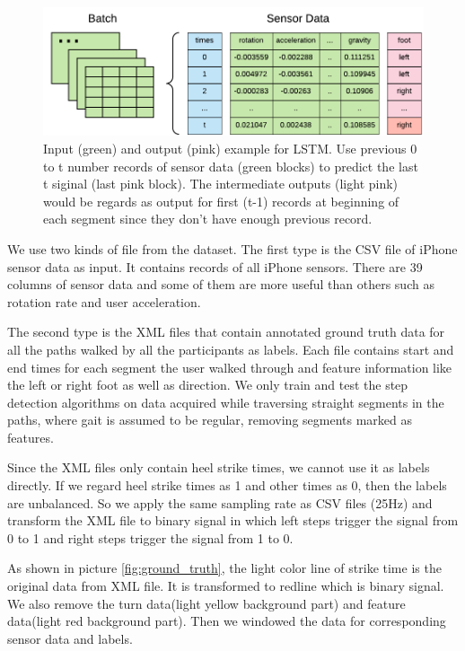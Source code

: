 \documentclass[11pt]{article}
\begin{document}
{\begin{figure}[ht]
\centering
\includegraphics[scale=1]{input2}
\caption{Input (green) and output (pink) example for LSTM. Use previous 0 to t number records of sensor data (green blocks) to predict the last t siginal (last pink block). The intermediate outputs (light pink) would be regards as output for first (t-1) records at beginning of each segment since they don't have enough previous record. }
\label{fig:batch_sensor_data}
\end{figure}

We use two kinds of file from the dataset. The first type is the CSV file of iPhone sensor data as input. It contains records of all iPhone sensors. There are 39 columns of sensor data and some of them are more useful than others such as rotation rate and user acceleration.

The second type is the XML files that contain annotated ground truth data for all the paths walked by all the participants as labels. Each file contains start and end times for each segment the user walked through and feature information like the left or right foot as well as direction. We only train and test the step detection algorithms on data acquired while traversing straight segments in the paths, where gait is assumed to be regular, removing segments marked as features. 

Since the XML files only contain heel strike times, we cannot use it as labels directly. If we regard heel strike times as 1 and other times as 0, then the labels are unbalanced. So we apply the same sampling rate as CSV files (25Hz) and transform the XML file to binary signal in which left steps trigger the signal from 0 to 1 and right steps trigger the signal from 1 to 0.

As shown in picture \ref{fig:ground_truth}, the light color line of strike time is the original data from XML file. It is transformed to redline which is binary signal. We also remove the turn data(light yellow background part) and feature data(light red background part). Then we windowed the data for corresponding sensor data and labels.


}
\end{document}
